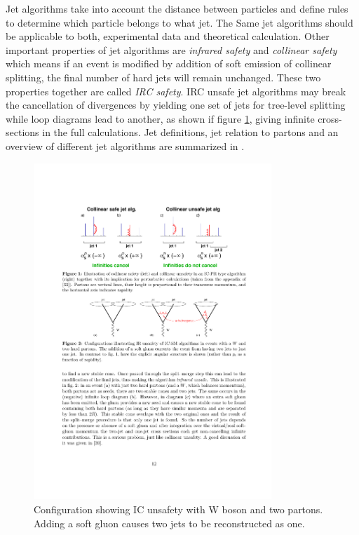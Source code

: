 Jet algorithms take into account the distance between particles and define rules to determine which particle belongs to what jet. The Same jet algorithms should be applicable to both, experimental data and theoretical calculation.  Other important properties of jet algorithms are \textit{infrared safety} and \textit{collinear safety} which means if an event is modified by addition of soft emission of collinear splitting, the final number of hard jets will remain unchanged. These two properties together are called \textit{IRC safety}. IRC unsafe jet algorithms may break the cancellation of divergences by yielding one set of jets for tree-level splitting while loop diagrams lead to another, as shown if figure \ref{fig:jet_unsafe}, giving infinite cross-sections in the full calculations. Jet definitions, jet relation to partons and an overview of different jet algorithms are summarized in \cite{Salam:2009jx}.
\begin{figure}[htbp]
	\centering
		\includegraphics[width=0.8\textwidth]{Figures/jet_unsafe2.pdf}
	\caption[An example of configuration of IRC unsafe jet algorithm.]{Configuration showing IC  unsafety with W boson and two partons. Adding a soft gluon causes two jets to be reconstructed as one. \cite{Salam:2009jx}}
	\label{fig:jet_unsafe}
\end{figure}

